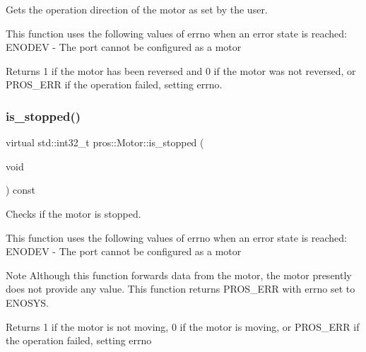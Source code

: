 Gets the operation direction of the motor as set by the user. 

This function uses the following values of errno when an error state is reached\+: E\+N\+O\+D\+EV -\/ The port cannot be configured as a motor

\begin{DoxyReturn}{Returns}
1 if the motor has been reversed and 0 if the motor was not reversed, or P\+R\+O\+S\+\_\+\+E\+RR if the operation failed, setting errno. 
\end{DoxyReturn}
\mbox{\label{classpros_1_1Motor_a884c19ae71a6c9f0b316520f09769be9}} 
\subsubsection{\texorpdfstring{is\+\_\+stopped()}{is\_stopped()}}
{\footnotesize\ttfamily virtual std\+::int32\+\_\+t pros\+::\+Motor\+::is\+\_\+stopped (\begin{DoxyParamCaption}\item[{void}]{ }\end{DoxyParamCaption}) const\hspace{0.3cm}{\ttfamily [virtual]}}



Checks if the motor is stopped. 

This function uses the following values of errno when an error state is reached\+: E\+N\+O\+D\+EV -\/ The port cannot be configured as a motor

\begin{DoxyNote}{Note}
Although this function forwards data from the motor, the motor presently does not provide any value. This function returns P\+R\+O\+S\+\_\+\+E\+RR with errno set to E\+N\+O\+S\+YS.
\end{DoxyNote}
\begin{DoxyReturn}{Returns}
1 if the motor is not moving, 0 if the motor is moving, or P\+R\+O\+S\+\_\+\+E\+RR if the operation failed, setting errno 
\end{DoxyReturn}
\mbox{\label{classpros_1_1Motor_a44f39232cec1caee6d668d8ff21dc28b}} 
